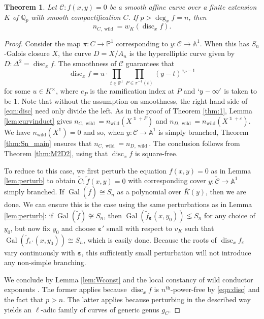 \documentclass[12pt]{amsart}
\newtheorem{theorem}{Theorem}[section]
\theoremstyle{definition}
\theoremstyle{remark}
\newcommand{\eps}{\varepsilon}
\newcommand{\QQ}{\mathbb{Q}}
\newcommand{\Proj}{\mathbb{P}}
\DeclareMathOperator{\Gal}{Gal}
\DeclareMathOperator{\disc}{disc}
\DeclareMathOperator{\wild}{wild}
\renewcommand{\bar}{\overline}
\renewcommand{\tilde}{\widetilde}
\DeclareMathOperator{\one}{\mathds{1}}
\begin{document}
\begin{theorem}\label{thm:main2}
    Let $\mathcal{C}:f(x,y)=0$ be a smooth affine curve over a finite extension $K$ of $\QQ_p$ with smooth compactification $C$. If $p>\deg_x f=n$, then
    \[n_{{C},\wild}=w_K(\disc_x f).\]
\end{theorem}

\begin{proof}
    Consider the map $\pi: C\to \Proj^1$ corresponding to $y: \mathcal{C}\to \mathbb{A}^1$. When this has $S_n$-Galois closure $X$, the curve $D=X/A_n$ is the hyperelliptic curve given by $D: \Delta^2 = \disc_x f$. The smoothness of $\mathcal{C}$ guarantees that
    \begin{equation}\label{eqn:disc}\tag{$**$}
        \disc_x f = u\cdot\prod_{t\in\Proj^1}\prod_{P\in\pi^{-1}(t)} (y-t)^{e_P-1}
    \end{equation}
    for some $u\in K^\times$, where $e_P$ is the ramification index at $P$ and $`y-\infty'$ is taken to be $1$. Note that without the assumption on smoothness, the right-hand side of \eqref{eqn:disc} need only divide the left. As in the proof of Theorem \ref{thm:1}, Lemma \ref{lem:curvinduct} gives $n_{C,\wild}=n_{\wild}(X^{\one+F})$ and $n_{D,\wild}=n_{\wild}(X^{\one + \eps})$. We have $n_{\wild}(X^{\one})=0$ and so, when $y:\mathcal{C}\to\mathbb{A}^1$ is simply branched, Theorem \ref{thm:Sn_main} ensures that $n_{C,\wild}=n_{D,\wild}$. The conclusion follows from Theorem \ref{thm:M2D2}, using that $\disc_x f$ is square-free. 

    To reduce to this case, we first perturb the equation $f(x,y)=0$ as in Lemma \ref{lem:perturb} to obtain $\tilde{C}: \tilde{f}(x,y)=0$ with corresponding cover $y:\tilde{\mathcal{C}}\to\mathbb{A}^1$ simply branched. If $\Gal(\tilde{f})\cong S_n$ as a polynomial over $\bar{K}(y)$, then we are done. We can ensure this is the case using the same perturbations as in Lemma \ref{lem:perturb}: if $\Gal(\tilde{f})\not\cong S_n$, then $\Gal(\tilde{f}_{\pmb{\eps}}(x,y_0))\lneq S_n$ for any choice of $y_0$, but now fix $y_0$ and choose $\pmb{\eps}'$ small with respect to $v_K$ such that $\Gal(\tilde{f}_{\pmb{\eps}'}(x,y_0))\cong S_n$, which is easily done. Because the roots of $\disc_x f_{\pmb{\eps}}$ vary continuously with $\pmb{\eps}$, this sufficiently small perturbation will not introduce any non-simple branching. 
    
    We conclude by Lemma \ref{lem:Wconst} and the local constancy of wild conductor exponents \cite[Theorem 5.1(1)]{Kisin1999}. The former applies because $\disc_x f$ is $n^\text{th}$-power-free by \eqref{eqn:disc} and the fact that $p>n$. The latter applies because perturbing in the described way yields an $\ell$-adic family of curves of generic genus $g_C$.
\end{proof}
\end{document}
